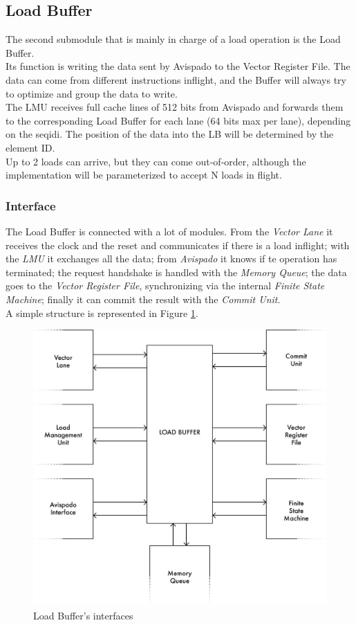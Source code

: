 \subsection{Load Buffer}
The second submodule that is mainly in charge of a load operation is the Load Buffer.\\
Its function is writing the data sent by Avispado to the Vector Register File. The data can come from different instructions inflight, and the Buffer will always try to optimize and group the data to write.\\

The LMU receives full cache lines of 512 bits from Avispado and forwards them to the corresponding Load Buffer for each lane (64 bits max per lane), depending on the seq\+id\+i. The position of the data into the LB will be determined by the element ID.\\

Up to 2 loads can arrive, but they can come out-of-order, although the implementation will be parameterized to accept N loads in flight.
\subsubsection{Interface}
The Load Buffer is connected with a lot of modules. From the \emph{Vector Lane} it receives the clock and the reset and communicates if there is a load inflight; with the \emph{LMU} it exchanges all the data; from \emph{Avispado} it knows if te operation has terminated; the request handshake is handled with the \emph{Memory Queue}; the data goes to the \emph{Vector Register File}, synchronizing via the internal \emph{Finite State Machine}; finally it can commit the result with the \emph{Commit Unit}.\\

A simple structure is represented in Figure \ref{lb-if}.

\begin{figure}[H]
    \centering
    \includegraphics[scale = 0.4]{Chapter_2/img/lb-if.png}
    \caption{Load Buffer's interfaces}
    \label{lb-if}
\end{figure}

